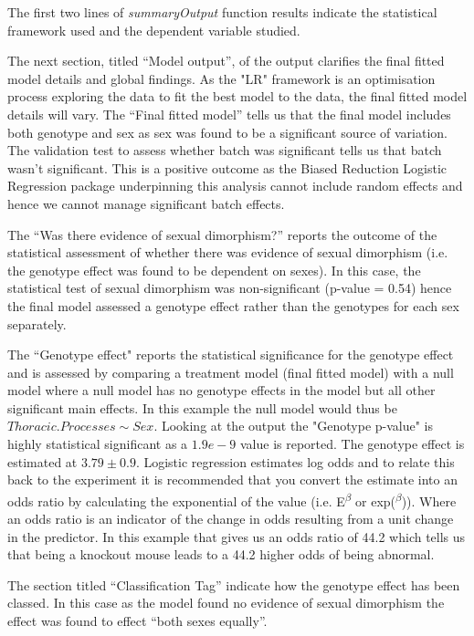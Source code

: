 \documentclass[12pt,a4paper]{article}
\begin{document}
The first two lines of \textit{summaryOutput} function results indicate the statistical framework used and the dependent variable studied. 

The next section, titled “Model output”, of the output clarifies the final fitted model details and global findings.  As the "LR" framework is an optimisation process exploring the data to fit the best model to the data, the final fitted model details will vary. The “Final fitted model” tells us that the final model includes both genotype and sex as sex was found to be a significant source of variation. The validation test to assess whether batch was significant tells us that batch wasn’t significant. This is a positive outcome as the Biased Reduction Logistic Regression package underpinning this analysis cannot include random effects and hence we cannot manage significant batch effects. 

The “Was there evidence of sexual dimorphism?” reports the outcome of the statistical assessment of whether there was evidence of sexual dimorphism (i.e. the genotype effect was found to be dependent on sexes). In this case, the statistical test of sexual dimorphism was non-significant (p-value = 0.54) hence the final model assessed a genotype effect rather than the genotypes for each sex separately. 

The “Genotype effect" reports the statistical significance for the genotype effect and is assessed by comparing a treatment model (final fitted model) with a null model where a null model has no genotype effects in the model but all other significant main effects. In this example the null model would thus be $Thoracic.Processes \sim Sex$. Looking at the output the "Genotype p-value" is highly statistical significant as a $1.9e-9$ value is reported. The genotype effect is estimated at $3.79 \pm 0.9$. Logistic regression estimates log odds and to relate this back to the experiment it is recommended that you convert the estimate into an odds ratio by calculating the exponential of the value (i.e. E\textsuperscript{$\beta$} or exp(\textsuperscript{$\beta$})). Where an odds ratio is an indicator of the change in odds resulting from a unit change in the predictor. In this example that gives us an odds ratio of 44.2 which tells us that being a knockout mouse leads to a 44.2 higher odds of being abnormal.

The section titled “Classification Tag” indicate how the genotype effect has been classed.  In this case as the model found no evidence of sexual dimorphism the effect was found to effect “both sexes equally”.   
\end{document}

